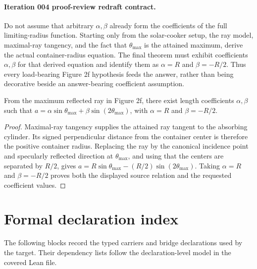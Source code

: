\paragraph{Iteration 004 proof-review redraft contract.}
Do not assume that arbitrary \(\alpha,\beta\) already form the coefficients of
the full limiting-radius function.  Starting only from the solar-cooker setup,
the ray model, maximal-ray tangency, and the fact that
\(\theta_{\max}\) is the attained maximum, derive the actual container-radius
equation.  The final theorem must exhibit coefficients \(\alpha,\beta\) for
that derived equation and identify them as
\(\alpha=R\) and \(\beta=-R/2\).  Thus every load-bearing Figure 2f hypothesis
feeds the answer, rather than being decorative beside an answer-bearing
coefficient assumption.

\begin{theorem}
  \label{thm:physics:IPhO_2026_2_B_1:target}
  From the maximum reflected ray in Figure 2f, there exist length
  coefficients \(\alpha,\beta\) such that
  \(a=\alpha\sin\theta_{\max}+\beta\sin(2\theta_{\max})\), with
  \(\alpha=R\) and \(\beta=-R/2\).
\end{theorem}
\begin{proof}
  Maximal-ray tangency supplies the attained ray tangent to the absorbing
  cylinder.  Its signed perpendicular distance from the container center is
  therefore the positive container radius.  Replacing the ray by the
  canonical incidence point and specularly reflected direction at
  \(\theta_{\max}\), and using that the centers are separated by \(R/2\),
  gives
  \(a=R\sin\theta_{\max}-(R/2)\sin(2\theta_{\max})\).
  Taking \(\alpha=R\) and \(\beta=-R/2\) proves both the displayed source
  relation and the requested coefficient values.
\end{proof}
\section*{Formal declaration index}
The following blocks record the typed carriers and bridge declarations used by the target.  Their dependency lists follow the declaration-level model in the covered Lean file.


